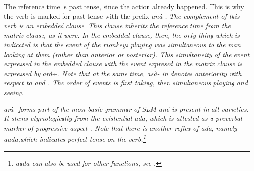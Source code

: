 \\ 

The reference time is past tense, since the action already happened. This is why the verb  is marked for past tense with the prefix \em anà-\em. The complement of this verb is an embedded clause. This clause inherits the  reference time from the matrix clause, as it were. In the embedded clause, then, the only thing which is indicated is that the event of the monkeys playing was simultaneous to the man looking at them (rather than anterior or posterior). This simultaneity of the event expressed in the embedded clause with the event expresed in the matrix clause is expressed by \em arà$\div$\em. Note that at the same time, \em asà- \em in  denotes anteriority with respect to  and . The order of events is first taking, then simultaneous playing and seeing.

\em arà- \em forms part of the most basic grammar of SLM and is present in all varieties. It stems etymologically from the existential \em*ada\em, which is attested as a preverbal marker of progressive aspect \citep[14]{Adelaar2005struct}. Note that there is another reflex of \em*ada\em, namely \em aada,\em which indicates perfect tense on the verb.\footnote{\em aada \em can also be used for other functions, see .}

% 
% 
% 




